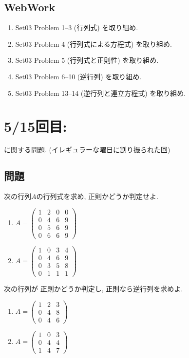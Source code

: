 \subsection{WebWork}
\begin{enumerate}
\item Set03 Problem 1--3 (行列式) を取り組め.
\item Set03 Problem 4 (行列式による方程式) を取り組め.
\item Set03 Problem 5 (行列式と正則性) を取り組め.
\item Set03 Problem 6--10 (逆行列) を取り組め.

\item Set03 Problem 13--14 (逆行列と連立方程式) を取り組め.
\end{enumerate}

\newpage
\section{5/15回目: }
に関する問題.
(イレギュラーな曜日に割り振られた回)
\subsection{問題}
\begin{quiz}
  次の行列$A$の行列式を求め,
  正則かどうか判定せよ.
  \begin{enumerate}
  \item
    $A=
    \begin{pmatrix}
      1&2&0&0\\
      0&4&6&9\\
      0&5&6&9\\
      0&6&6&9
    \end{pmatrix}$
  \item
    $A=
    \begin{pmatrix}
      1&0&3&4\\
      0&4&6&9\\
      0&3&5&8\\
      0&1&1&1
    \end{pmatrix}$
\end{enumerate}
\end{quiz}

\begin{quiz}
  次の行列が
  正則かどうか判定し,
  正則なら逆行列を求めよ.
  \begin{enumerate}
  \item
    $A=
    \begin{pmatrix}
      1&2&3\\
      0&4&8\\
      0&4&6
    \end{pmatrix}$
  \item
    $A=
    \begin{pmatrix}
      1&0&3\\
      0&4&4\\
      1&4&7
    \end{pmatrix}$
\end{enumerate}
\end{quiz}


